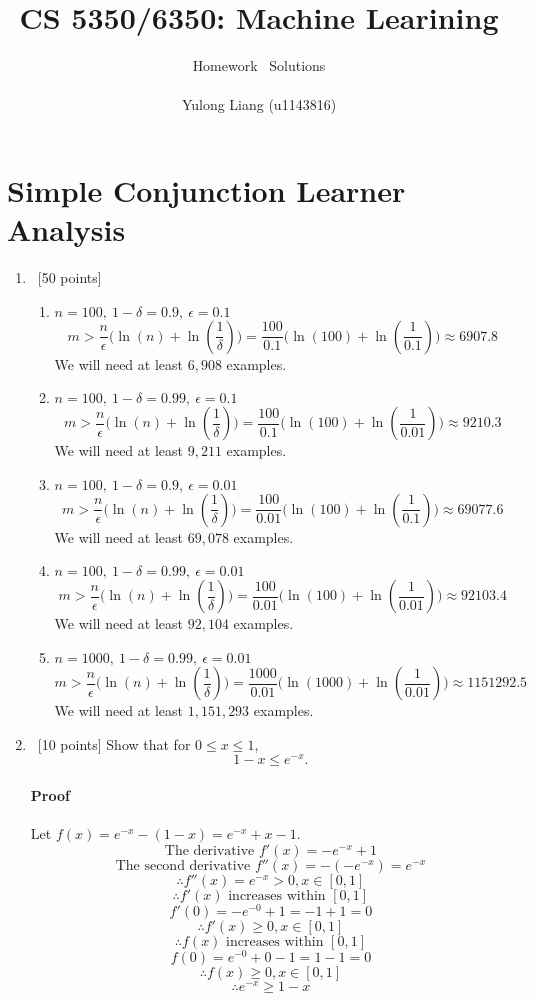 \documentclass[12pt, fullpage,letterpaper]{article}
\title{CS 5350/6350: Machine Learining \semester}
\author{Homework \assignmentId\ Solutions\\\\Yulong Liang (u1143816)}
\begin{document}
\maketitle

\section{Simple Conjunction Learner Analysis}

\begin{enumerate}
\item~[50 points]
\begin{enumerate}
\item $n=100,\ 1-\delta=0.9,\ \epsilon=0.1$\\
$$m>\frac{n}{\epsilon}\Big(\ln(n)+\ln(\frac{1}{\delta})\Big)=\frac{100}{0.1}\Big(\ln(100)+\ln(\frac{1}{0.1})\Big)\approx6907.8$$
We will need at least $6,908$ examples.
\item $n=100,\ 1-\delta=0.99,\ \epsilon=0.1$\\
$$m>\frac{n}{\epsilon}\Big(\ln(n)+\ln(\frac{1}{\delta})\Big)=\frac{100}{0.1}\Big(\ln(100)+\ln(\frac{1}{0.01})\Big)\approx9210.3$$
We will need at least $9,211$ examples.
\item $n=100,\ 1-\delta=0.9,\ \epsilon=0.01$\\
$$m>\frac{n}{\epsilon}\Big(\ln(n)+\ln(\frac{1}{\delta})\Big)=\frac{100}{0.01}\Big(\ln(100)+\ln(\frac{1}{0.1})\Big)\approx69077.6$$
We will need at least $69,078$ examples.
\item $n=100,\ 1-\delta=0.99,\ \epsilon=0.01$\\
$$m>\frac{n}{\epsilon}\Big(\ln(n)+\ln(\frac{1}{\delta})\Big)=\frac{100}{0.01}\Big(\ln(100)+\ln(\frac{1}{0.01})\Big)\approx92103.4$$
We will need at least $92,104$ examples.
\item $n=1000,\ 1-\delta=0.99,\ \epsilon=0.01$\\
$$m>\frac{n}{\epsilon}\Big(\ln(n)+\ln(\frac{1}{\delta})\Big)=\frac{1000}{0.01}\Big(\ln(1000)+\ln(\frac{1}{0.01})\Big)\approx1151292.5$$
We will need at least $1,151,293$ examples.
\end{enumerate}
\item~[10 points] Show that for $0\le x \le 1$, 
\[1 - x \le e^{-x}.\]
\paragraph{Proof}Let $f(x)=e^{-x}-(1-x)=e^{-x}+x-1$.
$$\text{The derivative } f'(x)=-e^{-x}+1$$
$$\text{The second derivative } f''(x)=-(-e^{-x})=e^{-x}$$
$$\therefore f''(x)=e^{-x}>0, x\in[0,1]$$
$$\therefore f'(x) \text{ increases within } [0,1]$$
$$f'(0)=-e^{-0}+1=-1+1=0$$
$$\therefore f'(x)\ge0, x\in[0,1]$$
$$\therefore f(x) \text{ increases within } [0,1]$$
$$f(0)=e^{-0}+0-1=1-1=0$$
$$\therefore f(x)\ge0, x\in[0,1]$$
$$\therefore e^{-x}\ge1-x$$
\end{enumerate}
\end{document}
